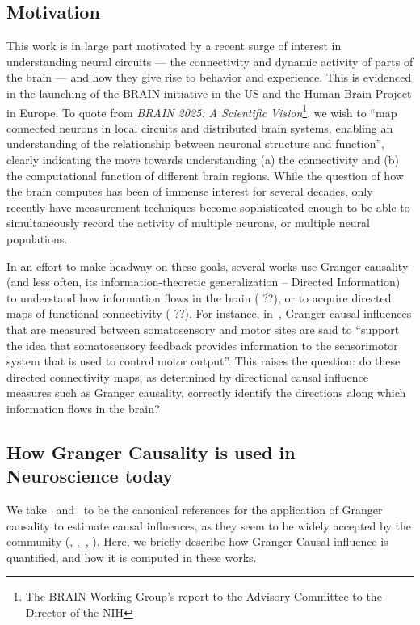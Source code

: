 \documentclass[conference]{IEEEtran}
\begin{document}

\subsection{Motivation}
\label{sec:motivation}

This work is in large part motivated by a recent surge of interest in understanding neural circuits --- the connectivity and dynamic activity of parts of the brain --- and how they give rise to behavior and experience. This is evidenced in the launching of the BRAIN initiative in the US and the Human Brain Project in Europe. To quote from \emph{BRAIN 2025: A Scientific Vision}\footnote{The BRAIN Working Group's report to the Advisory Committee to the Director of the NIH}, we wish to ``map connected neurons in local circuits and distributed brain systems, enabling an understanding of the relationship between neuronal structure and function'', clearly indicating the move towards understanding (a) the connectivity and (b) the computational function of different brain regions. While the question of how the brain computes has been of immense interest for several decades, only recently have measurement techniques become sophisticated enough to be able to simultaneously record the activity of multiple neurons, or multiple neural populations.

In an effort to make headway on these goals, several works use Granger causality (and less often, its information-theoretic generalization -- Directed Information) to understand how information flows in the brain ({\color{red} ??}), or to acquire directed maps of functional connectivity ({\color{red} ??}). For instance, in~\cite{Brovelli2004BetaOscillations}, Granger causal influences that are measured between somatosensory and motor sites are said to ``support the idea that somatosensory feedback provides information to the sensorimotor system that is used to control motor output''. This raises the question: do these directed connectivity maps, as determined by directional causal influence measures such as Granger causality, correctly identify the directions along which information flows in the brain?

\subsection{How Granger Causality is used in Neuroscience today}

We take~\cite{Brovelli2004BetaOscillations} and~\cite{Ding1999ShortWindow} to be the canonical references for the application of Granger causality to estimate causal influences, as they seem to be widely accepted by the community (\cite{Bressler2011WienerGranger},{\color{red} \cite{Roebroeck2005MappingDirected}},~\cite{Ding2006GrangerCausality}, \cite{Barnett2014MVGC}). Here, we briefly describe how Granger Causal influence is quantified, and how it is computed in these works.
\end{document}
